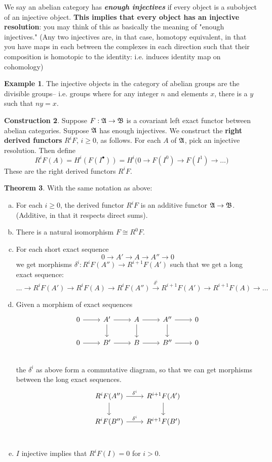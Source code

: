 \documentclass[10pt,reqno]{amsart}
\theoremstyle{definition}
\newtheorem{theorem}{Theorem}
\newtheorem{example}[theorem]{Example}
\newtheorem{construction}[theorem]{Construction}
\theoremstyle{remark}
\numberwithin{equation}{section}
\numberwithin{theorem}{section}
\begin{document}
We say an abelian category has \textbf{\textit{enough injectives}} if every object is a subobject of an injective object. \textbf{This implies that every object has an injective resolution}: you may think of this as basically the meaning of "enough injectives." (Any two injectives are, in that case, homotopy equivalent, in that you have maps in each between the complexes in each direction such that their composition is homotopic to the identity: i.e. induces identity map on cohomology)

\begin{example}
The injective objects in the category of abelian groups are the divisible groups-- i.e. groups where for any integer $n$ and elements $x$, there is a $y$ such that $ny = x$.
\end{example}

\begin{construction} Suppose $F: \frak{A} \to \frak{B}$ is a covariant left exact functor between abelian categories. Suppose $\frak{A}$ has enough injectives. We construct the \textbf{right derived functors} $R^i F$, $i \ge 0$, as follows. For each $A$ of $\frak{A}$, pick an injective resolution. Then define
\[R^iF(A) = H^i(F(I^{\bullet})) = H^i\Big(0 \to F(I^0) \to F(I^1) \to \dots\Big)\]
These are the right derived functors $R^i F$.
\end{construction}

\begin{theorem} With the same notation as above:
\begin{enumerate}[(a)]
\item For each $i \ge 0$, the derived functor $R^i F$ is an additive functor $\frak{A} \to \frak{B}$. (Additive, in that it respects direct sums).
\item There is a natural isomorphism $F \cong R^0 F$.
\item For each short exact sequence 
\[0 \to A' \to A \to A'' \to 0\]
we get morphisms $\delta^i: R^iF(A'') \to R^{i+1}F(A')$ such that we get a long exact sequence:
\[\dots \to R^iF(A') \to R^iF(A) \to R^iF(A'') \stackrel{\delta^i}{\longrightarrow} R^{i+1}F(A') \to R^{i+1}F(A) \to \dots \]
\item Given a morphism of exact sequences
\[
\begin{tikzcd}
0 \arrow[r] & A' \arrow[r] \arrow[d] & A \arrow[r] \arrow[d] & A'' \arrow[r] \arrow[d]& 0 \\
0 \arrow[r] & B' \arrow[r] & B \arrow[r] & B'' \arrow[r] & 0 \\
\end{tikzcd}
\]
the $\delta^i$ as above form a commutative diagram, so that we can get morphisms between the long exact sequences.
\[\begin{tikzcd}
R^i F(A'') \arrow[r,"\delta^i"] \arrow[d] & R^{i+1}F(A') \arrow[d]\\
R^i F(B'') \arrow[r,"\delta^i"]& R^{i+1}F(B')\\
\end{tikzcd}
\]
\item $I$ injective implies that $R^iF(I) = 0$ for $i > 0$.
\end{enumerate}
\end{theorem}
\end{document}
